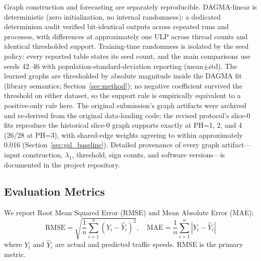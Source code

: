 Graph construction and forecasting are separately reproducible. DAGMA-linear is deterministic (zero initialization, no internal randomness): a dedicated determinism audit verified bit-identical outputs across repeated runs and processes, with differences at approximately one ULP across thread counts and identical thresholded support. Training-time randomness is isolated by the seed policy: every reported table states its seed count, and the main comparisons use seeds 42--46 with population-standard-deviation reporting (mean$\pm$std). The learned graphs are thresholded by absolute magnitude inside the DAGMA fit (library semantics; Section~\ref{sec:method}); no negative coefficient survived the threshold on either dataset, so the support rule is empirically equivalent to a positive-only rule here. The original submission's graph artifacts were archived and re-derived from the original data-loading code; the revised protocol's slice-0 fits reproduce the historical slice-0 graph supports exactly at PH=1, 2, and 4 (26/28 at PH=3), with shared-edge weights agreeing to within approximately 0.016 (Section~\ref{sec:gsl_baseline}). Detailed provenance of every graph artifact---input construction, $\lambda_1$, threshold, sign counts, and software versions---is documented in the project repository.

\subsection{Evaluation Metrics}

We report Root Mean Squared Error (RMSE) and Mean Absolute Error (MAE):
\begin{equation}
\text{RMSE} = \sqrt{\frac{1}{n}\sum_{i=1}^{n}(Y_i - \hat{Y}_i)^2}, \quad
\text{MAE} = \frac{1}{n}\sum_{i=1}^{n}|Y_i - \hat{Y}_i|
\end{equation}
where $Y_i$ and $\hat{Y}_i$ are actual and predicted traffic speeds. RMSE is the primary metric.
